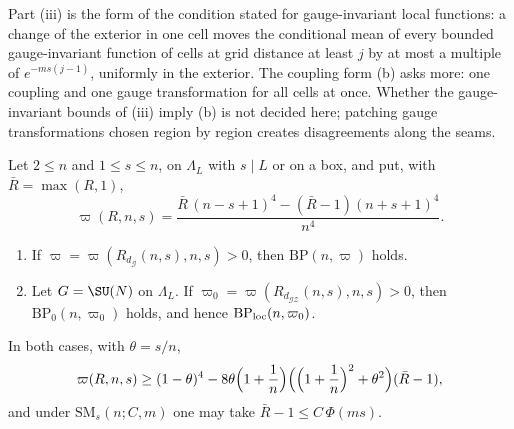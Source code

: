 Part (iii) is the form of the condition stated for gauge-invariant local
functions: a change of the exterior in one cell moves the conditional mean of
every bounded gauge-invariant function of cells at grid distance at least $j$
by at most a multiple of $e^{-ms(j-1)}$, uniformly in the exterior. The
coupling form (b) asks more: one coupling and one gauge transformation for
all cells at once. Whether the gauge-invariant bounds of (iii) imply (b) is
not decided here; patching gauge transformations chosen region by region
creates disagreements along the seams.

\begin{theorem}\label{rW9:main}
Let $2\le n$ and $1\le s\le n$, on $\Lambda_L$ with $s\mid L$ or on a box, and
put, with $\bar R=\max(R,1)$,
\[
\varpi(R,n,s)=\frac{\bar R\,(n-s+1)^4-(\bar R-1)(n+s+1)^4}{n^4}.
\]
\begin{enumerate}[label=\textup{(\roman*)},leftmargin=*]
\item If $\varpi=\varpi(R_{d_{\mathcal G}}(n,s),n,s)>0$, then
$\mathrm{BP}(n,\varpi)$ holds.
\item Let $G=\SU(N)$ on $\Lambda_L$. If $\varpi_0=\varpi(R_{d_{\mathcal{GZ}}}
(n,s),n,s)>0$, then $\mathrm{BP}_0(n,\varpi_0)$ holds, and hence
$\mathrm{BP}_{\rm loc}(n,\varpi_0)$.
\end{enumerate}
In both cases, with $\theta=s/n$,
\[
\varpi(R,n,s)\ge(1-\theta)^4-8\theta\Bigl(1+\frac1n\Bigr)\Bigl(\Bigl(1+
\frac1n\Bigr)^2+\theta^2\Bigr)(\bar R-1),
\]
and under $\mathrm{SM}_s(n;C,m)$ one may take $\bar R-1\le C\,\Phi(ms)$.
\end{theorem}
